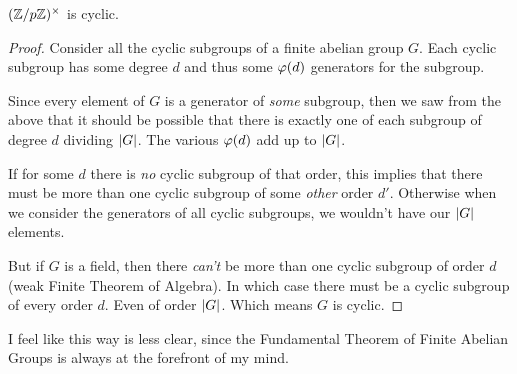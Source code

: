 \begin{theorem}
  $\mathopen{}\left( {\mathbb{Z} / p\mathbb{Z}} \right)\mathclose{}^\times$ is cyclic.
\end{theorem}

\begin{proof}
  Consider all the cyclic subgroups of a finite abelian group $G$. Each
  cyclic subgroup has some degree $d$ and thus some $\varphi\mathopen{}\left( {d} \right)\mathclose{}$
  generators for the subgroup.

  Since every element of $G$ is a generator of \emph{some} subgroup,
  then we saw from the above that it should be possible that there is
  exactly one of each subgroup of degree $d$ dividing $|G|$. The
  various $\varphi\mathopen{}\left( {d} \right)\mathclose{}$ add up to $|G|$.

  If for some $d$ there is \emph{no} cyclic subgroup of that order, this
  implies that there must be more than one cyclic subgroup of some
  \emph{other} order $d'$. Otherwise when we consider the generators of
  all cyclic subgroups, we wouldn't have our $|G|$ elements.

  But if $G$ is a field, then there \emph{can't} be more than one cyclic
  subgroup of order $d$ (weak Finite Theorem of Algebra). In which case
  there must be a cyclic subgroup of every order $d$. Even of order
  $|G|$. Which means $G$ is cyclic.
\end{proof}

\begin{remark}
  I feel like this way is less clear, since the Fundamental Theorem of
  Finite Abelian Groups is always at the forefront of my mind.
\end{remark}


